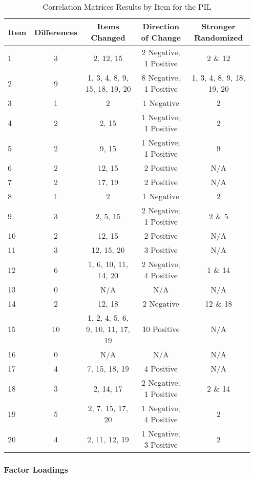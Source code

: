 \documentclass[english,man]{apa6}
\theoremstyle{definition}
\theoremstyle{definition}
\theoremstyle{definition}
\theoremstyle{remark}
\begin{document}
\begin{table}[tbp]
\begin{center}
\begin{threeparttable}
\caption{\label{tab:cor-table-pil}Correlation Matrices Results by Item for the PIL}
\small{
\begin{tabular}{lcccc}
\toprule
Item & Differences & Items Changed & Direction of Change & Stronger Randomized\\
\midrule
1 & 3 & 2, 12, 15 & 2 Negative; 1 Positive & 2 \& 12\\
2 & 9 & 1, 3, 4, 8, 9, 
15, 18, 19, 20 & 8 Negative; 1 Positive & 1, 3, 4, 8, 9, 
18, 19, 20\\
3 & 1 & 2 & 1 Negative & 2\\
4 & 2 & 2, 15 & 1 Negative; 1 Positive & 2\\
5 & 2 & 9, 15 & 1 Negative; 1 Positive & 9\\
6 & 2 & 12, 15 & 2 Positive & N/A\\
7 & 2 & 17, 19 & 2 Positive & N/A\\
8 & 1 & 2 & 1 Negative & 2\\
9 & 3 & 2, 5, 15 & 2 Negative; 1 Positive & 2 \& 5\\
10 & 2 & 12, 15 & 2 Positive & N/A\\
11 & 3 & 12, 15, 20 & 3 Positive & N/A\\
12 & 6 & 1, 6, 10, 11, 14, 20 & 2 Negative; 4 Positive & 1 \& 14\\
13 & 0 & N/A & N/A & N/A\\
14 & 2 & 12, 18 & 2 Negative & 12 \& 18\\
15 & 10 & 1, 2, 4, 5, 6, 9, 
10, 11, 17, 19 & 10 Positive & N/A\\
16 & 0 & N/A & N/A & N/A\\
17 & 4 & 7, 15, 18, 19 & 4 Positive & N/A\\
18 & 3 & 2, 14, 17 & 2 Negative; 1 Positive & 2 \& 14\\
19 & 5 & 2, 7, 15, 17, 20 & 1 Negative; 4 Positive & 2\\
20 & 4 & 2, 11, 12, 19 & 1 Negative; 3 Positive & 2\\
\bottomrule
\end{tabular}
}
\end{threeparttable}
\end{center}
\end{table}

\subsubsection{Factor Loadings}\label{factor-loadings}
\end{document}
